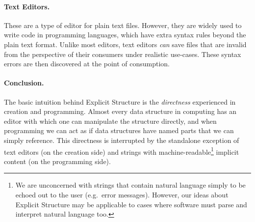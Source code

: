\paragraph{Text Editors.}

These are a type of editor for plain text files. However, they are
widely used to write code in programming languages, which have extra
syntax rules beyond the plain text format. Unlike most editors, text
editors \emph{can} save files that are invalid from the perspective of
their consumers under realistic use-cases. These syntax errors are then
discovered at the point of consumption.

\paragraph{Conclusion.}

The basic intuition behind Explicit Structure is the \emph{directness}
experienced in creation and programming. Almost every data structure in
computing has an editor with which one can manipulate the structure
directly, and when programming we can act as if data structures have
named parts that we can simply reference. This directness is interrupted
by the standalone exception of text editors (on the creation side) and
strings with machine-readable\footnote{We are unconcerned with strings
  that contain natural language simply to be echoed out to the user
  (e.g.~error messages). However, our ideas about Explicit Structure may
  be applicable to cases where software must parse and interpret natural
  language too.} implicit content (on the programming side).
